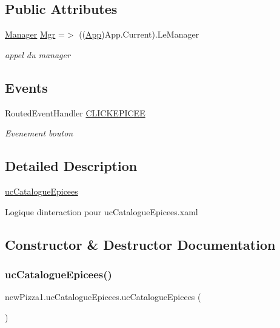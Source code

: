 \subsection*{Public Attributes}
\begin{DoxyCompactItemize}
\item 
\hyperlink{classModele_1_1Manager}{Manager} \hyperlink{classnewPizza1_1_1ucCatalogueEpicees_a30d96d36cd2657aa9b7315194c3c2f98}{Mgr} =$>$ ((\hyperlink{classnewPizza1_1_1App}{App})App.\+Current).Le\+Manager
\begin{DoxyCompactList}\small\item\em appel du manager \end{DoxyCompactList}\end{DoxyCompactItemize}
\subsection*{Events}
\begin{DoxyCompactItemize}
\item 
Routed\+Event\+Handler \hyperlink{classnewPizza1_1_1ucCatalogueEpicees_a289e3a4cecfede80cbe8d581e11219c6}{C\+L\+I\+C\+K\+E\+P\+I\+C\+EE}
\begin{DoxyCompactList}\small\item\em Evenement bouton \end{DoxyCompactList}\end{DoxyCompactItemize}


\subsection{Detailed Description}
\hyperlink{classnewPizza1_1_1ucCatalogueEpicees}{uc\+Catalogue\+Epicees} 

Logique d\textquotesingle{}interaction pour uc\+Catalogue\+Epicees.\+xaml 

\subsection{Constructor \& Destructor Documentation}
\mbox{\label{classnewPizza1_1_1ucCatalogueEpicees_a365541ffe4ce35f69bd313284950d564}} 
\subsubsection{\texorpdfstring{uc\+Catalogue\+Epicees()}{ucCatalogueEpicees()}}
{\footnotesize\ttfamily new\+Pizza1.\+uc\+Catalogue\+Epicees.\+uc\+Catalogue\+Epicees (\begin{DoxyParamCaption}{ }\end{DoxyParamCaption})\hspace{0.3cm}{\ttfamily [inline]}}



